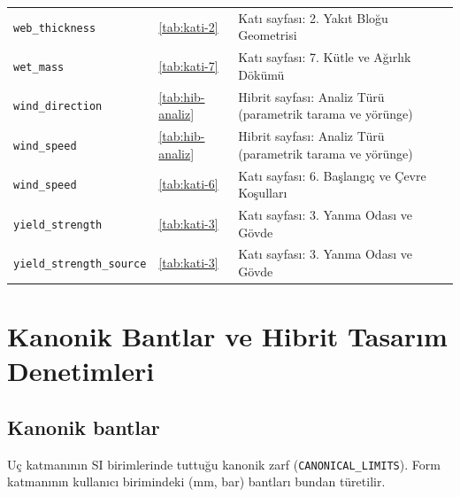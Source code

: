 \documentclass[11pt,a4paper]{article}
\newcommand{\kod}[1]{\texttt{#1}}
\begin{document}
{\begin{longtable}{@{}>{\raggedright\arraybackslash}p{5.2cm}p{1.4cm}>{\raggedright\arraybackslash}p{7.4cm}@{}}
\texttt{web\_\allowbreak{}thickness} & \ref{tab:kati-2} & Katı sayfası: 2. Yakıt Bloğu Geometrisi \\
\texttt{wet\_\allowbreak{}mass} & \ref{tab:kati-7} & Katı sayfası: 7. Kütle ve Ağırlık Dökümü \\
\texttt{wind\_\allowbreak{}direction} & \ref{tab:hib-analiz} & Hibrit sayfası: Analiz Türü (parametrik tarama ve yörünge) \\
\texttt{wind\_\allowbreak{}speed} & \ref{tab:hib-analiz} & Hibrit sayfası: Analiz Türü (parametrik tarama ve yörünge) \\
\texttt{wind\_\allowbreak{}speed} & \ref{tab:kati-6} & Katı sayfası: 6. Başlangıç ve Çevre Koşulları \\
\texttt{yield\_\allowbreak{}strength} & \ref{tab:kati-3} & Katı sayfası: 3. Yanma Odası ve Gövde \\
\texttt{yield\_\allowbreak{}strength\_\allowbreak{}source} & \ref{tab:kati-3} & Katı sayfası: 3. Yanma Odası ve Gövde \\
\end{longtable}}

\section{Kanonik Bantlar ve Hibrit Tasarım Denetimleri}\label{sec:eke}

\subsection{Kanonik bantlar}

Uç katmanının SI birimlerinde tuttuğu kanonik zarf (\kod{CANONICAL\_\allowbreak{}LIMITS}).
Form katmanının kullanıcı birimindeki (mm, bar) bantları bundan türetilir.
\end{document}
